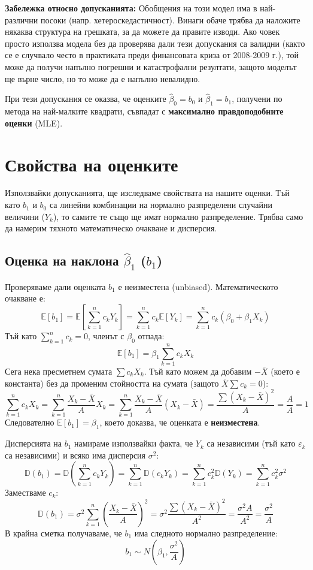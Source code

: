\documentclass{article}
\begin{document}
\textbf{Забележка относно допусканията:} Обобщения на този модел има в най-различни посоки (напр. хетероскедастичност). Винаги обаче трябва да наложите някаква структура на грешката, за да можете да правите изводи. Ако човек просто използва модела без да проверява дали тези допускания са валидни (както се е случвало често в практиката преди финансовата криза от 2008-2009 г.), той може да получи напълно погрешни и катастрофални резултати, защото моделът ще върне число, но то може да е напълно невалидно.

При тези допускания се оказва, че оценките $\hat{\beta}_0 = b_0$ и $\hat{\beta}_1 = b_1$, получени по метода на най-малките квадрати, съвпадат с \textbf{максимално правдоподобните оценки} (MLE).

\section{Свойства на оценките}

Използвайки допусканията, ще изследваме свойствата на нашите оценки. Тъй като $b_1$ и $b_0$ са линейни комбинации на нормално разпределени случайни величини ($Y_k$), то самите те също ще имат нормално разпределение. Трябва само да намерим тяхното математическо очакване и дисперсия.

\subsection{Оценка на наклона $\hat{\beta}_1$ ($b_1$)}
Проверяваме дали оценката $b_1$ е неизместена (unbiased). Математическото очакване е:
\[
\mathbb{E}[b_1] = \mathbb{E}\left[ \sum_{k=1}^n c_k Y_k \right] = \sum_{k=1}^n c_k \mathbb{E}[Y_k] = \sum_{k=1}^n c_k (\beta_0 + \beta_1 X_k)
\]
Тъй като $\sum_{k=1}^n c_k = 0$, членът с $\beta_0$ отпада:
\[
\mathbb{E}[b_1] = \beta_1 \sum_{k=1}^n c_k X_k
\]
Сега нека пресметнем сумата $\sum c_k X_k$. Тъй като можем да добавим $-\bar{X}$ (което е константа) без да променим стойността на сумата (защото $\bar{X} \sum c_k = 0$):
\[
\sum_{k=1}^n c_k X_k = \sum_{k=1}^n \frac{X_k - \bar{X}}{A} X_k = \sum_{k=1}^n \frac{X_k - \bar{X}}{A} (X_k - \bar{X}) = \frac{\sum (X_k - \bar{X})^2}{A} = \frac{A}{A} = 1
\]
Следователно $\mathbb{E}[b_1] = \beta_1$, което доказва, че оценката е \textbf{неизместена}.

Дисперсията на $b_1$ намираме използвайки факта, че $Y_k$ са независими (тъй като $\varepsilon_k$ са независими) и всяко има дисперсия $\sigma^2$:
\[
\mathbb{D}(b_1) = \mathbb{D}\left( \sum_{k=1}^n c_k Y_k \right) = \sum_{k=1}^n \mathbb{D}(c_k Y_k) = \sum_{k=1}^n c_k^2 \mathbb{D}(Y_k) = \sum_{k=1}^n c_k^2 \sigma^2
\]
Заместваме $c_k$:
\[
\mathbb{D}(b_1) = \sigma^2 \sum_{k=1}^n \left( \frac{X_k - \bar{X}}{A} \right)^2 = \sigma^2 \frac{\sum (X_k - \bar{X})^2}{A^2} = \frac{\sigma^2 A}{A^2} = \frac{\sigma^2}{A}
\]
В крайна сметка получаваме, че $b_1$ има следното нормално разпределение:
\[
b_1 \sim N\left(\beta_1, \frac{\sigma^2}{A}\right)
\]
\end{document}
